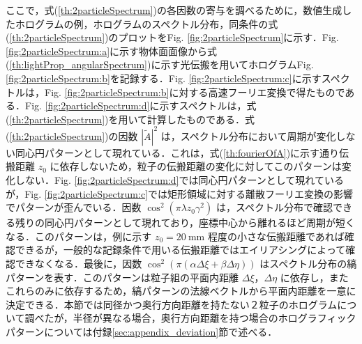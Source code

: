 ここで，式(\ref{th:2particleSpectrum})の各因数の寄与を調べるために，数値生成したホログラムの例，ホログラムのスペクトル分布，同条件の式(\ref{th:2particleSpectrum})のプロットをFig. \ref{fig:2particleSpectrum}に示す．Fig. \ref{fig:2particleSpectrum:a}に示す物体面面像から式(\ref{th:lightProp_angularSpectrum})に示す光伝搬を用いてホログラムFig. \ref{fig:2particleSpectrum:b}を記録する．Fig. \ref{fig:2particleSpectrum:c}に示すスペクトルは，Fig. \ref{fig:2particleSpectrum:b}に対する高速フーリエ変換で得たものである．Fig. \ref{fig:2particleSpectrum:d}に示すスペクトルは，式(\ref{th:2particleSpectrum})を用いて計算したものである．式(\ref{th:2particleSpectrum})の因数 $\left| \tilde{A} \right|^2$ は，スペクトル分布において周期が変化しない同心円パターンとして現れている．これは，式(\ref{th:fourierOfA})に示す通り伝搬距離 $z_0$ に依存しないため，粒子の伝搬距離の変化に対してこのパターンは変化しない．Fig. \ref{fig:2particleSpectrum:d}では同心円パターンとして現れているが，Fig. \ref{fig:2particleSpectrum:c}では矩形領域に対する離散フーリエ変換の影響でパターンが歪んでいる．因数 $\cos^2{\left( \pi \lambda z_0 \gamma^2 \right)}$ は，スペクトル分布で確認できる残りの同心円パターンとして現れており，座標中心から離れるほど周期が短くなる．このパターンは，例に示す $z_0 = \SI{20}{\mm}$ 程度の小さな伝搬距離であれば確認できるが，一般的な記録条件で用いる伝搬距離ではエイリアシングによって確認できなくなる．最後に，因数 $\cos^2{\left( \pi \left( \alpha \Delta \xi + \beta \Delta \eta \right) \right)}$ はスペクトル分布の縞パターンを表す．このパターンは粒子組の平面内距離 $\Delta \xi$，$\Delta \eta$ に依存し，またこれらのみに依存するため，縞パターンの法線ベクトルから平面内距離を一意に決定できる．本節では同径かつ奥行方向距離を持たない２粒子のホログラムについて調べたが，半径が異なる場合，奥行方向距離を持つ場合のホログラフィックパターンについては付録\ref{sec:appendix_deviation}節で述べる．

